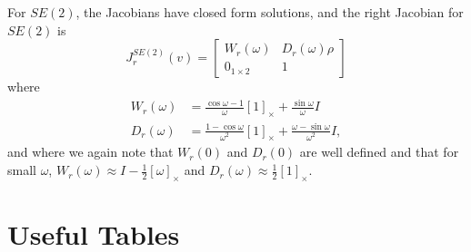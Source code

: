 For $SE(2)$, the Jacobians have closed form solutions, and
the right Jacobian for $SE(2)$ is 
\begin{equation}
    J_r^{SE(2)}(v) = \begin{bmatrix}
    W_r \left(\omega\right) & D_r \left(\omega\right)\rho \\
    0_{1\times 2} & 1
    \end{bmatrix}
\end{equation}
where 
\begin{align*}
    W_r \left(\omega\right) &=
    \frac{\cos{\omega}-1}{\omega}\left[ 1 \right]_\times + \frac{\sin{\omega}}{\omega}I  \\
    D_r \left(\omega\right) &=
    \frac{1-\cos{\omega}}{\omega^2}\left[ 1 \right]_\times + \frac{\omega - \sin{\omega}}{\omega^2}I,
\end{align*}
and where we again note that $W_r(0)$ and $D_r(0)$ are well defined and that for small $\omega$, 
$W_r(\omega)\approx I - \frac{1}{2}[\omega]_\times$ and $D_r(\omega)\approx \frac{1}{2}[1]_\times$.





\section{Useful Tables}

\label{sec:Tables}


